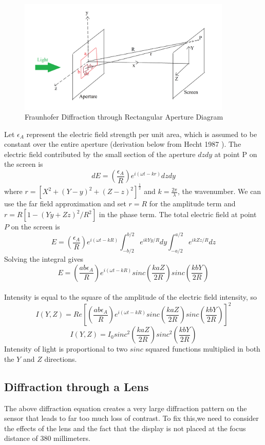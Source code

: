 \begin{figure}[ht]
  \centering
  \includegraphics[width=4in]{chapters/chapter8/images/Rectangular_Aperture.png}
  \caption{Fraunhofer Diffraction through Rectangular Aperture Diagram \cite{Rao:2014:FraunhoferDiffraction}}
  \label{fig:rectangle_aperture}
\end{figure}

Let $\epsilon_A$ represent the electric field strength per unit area, which is assumed to be constant over the entire aperture (derivation below from Hecht 1987 \cite{Hecht:1987:Optics}). The electric field contributed by the small section of the aperture $dzdy$ at point P on the screen is 
$$dE = \left(\frac{\epsilon_A}{R} \right)e^{i(\omega t-kr)}dzdy$$
where $r = [X^2 + (Y-y)^2+(Z-z)^2]^{\frac{1}{2}}$ and $k = \frac{2 \pi}{\lambda}$, the wavenumber. We can use the far field approximation and set $r = R$ for the amplitude term and $r = R[1-(Yy+Zz)^2/{R^2}]$ in the phase term. The total electric field at point $P$ on the screen is \\
$$E = \left(\frac{\epsilon_{A}}{R}\right)e^{i(\omega t-kR)} \int_{-b/2}^{b/2} e^{ikYy/R}dy \int_{-a/2}^{a/2} e^{ikZz/R} dz $$
Solving the integral gives \\
$$E = \left(\frac{ab\epsilon_A}{R}\right) e^{i(\omega t-kR)} sinc\left(\frac{kaZ}{2R}\right)sinc\left(\frac{kbY}{2R}\right) $$ \\
Intensity is equal to the square of the amplitude of the electric field intensity, so \\
$$I(Y,Z) = Re\left[\left(\frac{ab\epsilon_A}{R}\right)e^{i(\omega t - kR)} sinc\left(\frac{kaZ}{2R}\right) sinc\left(\frac{kbY}{2R}\right)\right]^2$$
$$I(Y,Z) = I_0  sinc^2\left(\frac{kaZ}{2R}\right) sinc^2\left(\frac{kbY}{2R}\right)$$
Intensity of light is proportional to two $sinc$ squared functions multiplied in both the $Y$ and $Z$ directions.


\subsection{Diffraction through a Lens}
The above diffraction equation creates a very large diffraction pattern on the sensor that leads to far too much loss of contrast. To fix this,we need to consider the effects of the lens and the fact that the display is not placed at the focus distance of 380 millimeters. 

